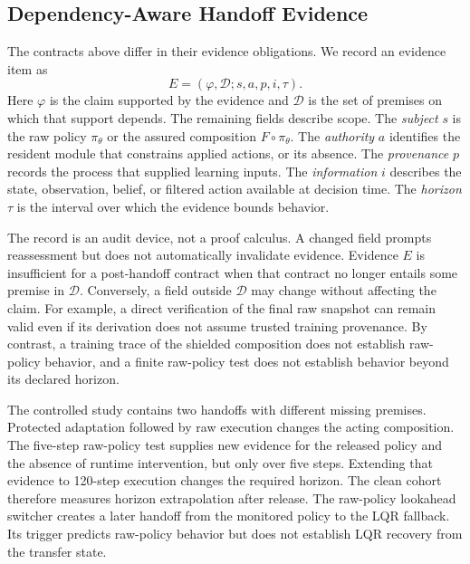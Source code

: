 \subsection{Dependency-Aware Handoff Evidence}
\label{sec:evidence-transfer}

The contracts above differ in their evidence obligations.  We record an
evidence item as
\begin{equation}
    E=(\varphi,\mathcal D; s,a,p,i,\tau).
\end{equation}
Here $\varphi$ is the claim supported by the evidence and $\mathcal D$ is the
set of premises on which that support depends.  The remaining fields describe
scope.  The \emph{subject} $s$ is the raw policy $\pi_\theta$ or the assured
composition $F\circ\pi_\theta$.  The \emph{authority} $a$ identifies the
resident module that constrains applied actions, or its absence.  The
\emph{provenance} $p$ records the process that supplied learning inputs.  The
\emph{information} $i$ describes the state, observation, belief, or filtered
action available at decision time.  The \emph{horizon} $\tau$ is the interval
over which the evidence bounds behavior.

The record is an audit device, not a proof calculus.  A changed field prompts
reassessment but does not automatically invalidate evidence.  Evidence $E$
is insufficient for a post-handoff contract when that contract no longer
entails some premise in $\mathcal D$.  Conversely, a field outside
$\mathcal D$ may change without affecting the claim.  For example, a direct
verification of the final raw snapshot can remain valid even if its derivation
does not assume trusted training provenance.  By contrast, a training trace of
the shielded composition does not establish raw-policy behavior, and a finite
raw-policy test does not establish behavior beyond its declared horizon.

The controlled study contains two handoffs with different missing premises.
Protected adaptation followed by raw execution changes the acting composition.
The five-step raw-policy test supplies new evidence for the released policy and
the absence of runtime intervention, but only over five steps.  Extending that
evidence to 120-step execution changes the required horizon.  The clean cohort
therefore measures horizon extrapolation after release.  The raw-policy
lookahead switcher creates a later handoff from the monitored policy to the LQR
fallback.  Its trigger predicts raw-policy behavior but does not establish LQR
recovery from the transfer state.

